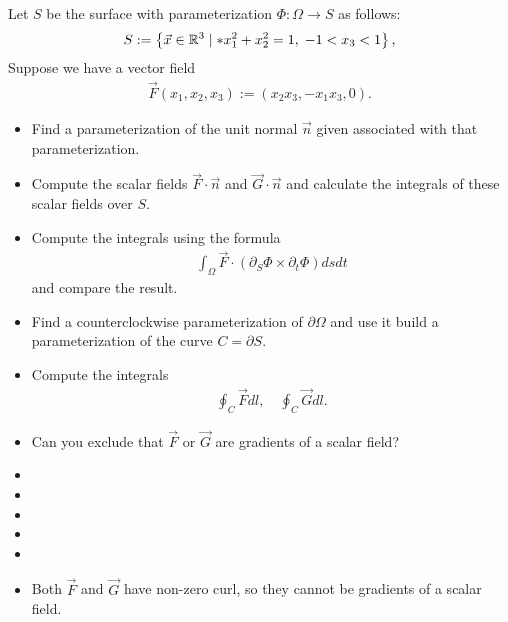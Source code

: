 \documentclass[11pt]{article}
\begin{document}
\begin{exercise}
    Let $S$ be the surface with parameterization $\Phi : \Omega \to S$ as follows:
    \begin{align}
     S := \left\{ \vec x \in \bbR^3 \suchthat* x_1^2 + x_2^2 = 1, \; -1 < x_3 < 1 \right\},
    \end{align}
    Suppose we have a vector field 
    \begin{align}
        \vec F(x_1,x_2,x_3) := (x_2 x_3, -x_1 x_3, 0 ).
    \end{align}
    \begin{itemize}
     \item
     Find a parameterization of the unit normal $\vec n$ given associated with that parameterization.
     \item
     Compute the scalar fields $\vec F \cdot \vec n$ and $\vec G \cdot \vec n$ and calculate the integrals of these scalar fields over $S$.
     \item
     Compute the integrals using the formula 
     \begin{align}
        \int_\Omega \vec F \cdot ( \partial_S \Phi \times \partial_t \Phi ) dsdt
     \end{align}
     and compare the result. 
     \item 
     Find a counterclockwise parameterization of $\partial\Omega$ and use it build a parameterization of the curve $C = \partial S$.
     \item 
     Compute the integrals 
     \begin{align}
        \oint_C \vec F dl, \quad \oint_C \vec G dl.
     \end{align}
     \item 
     Can you exclude that $\vec F$ or $\vec G$ are gradients of a scalar field?
    \end{itemize}
\end{exercise}
\begin{solution}     
    \begin{itemize}
     \item
     \item
     \item
     \item 
     \item 
     \item 
     Both $\vec F$ and $\vec G$ have non-zero curl, so they cannot be gradients of a scalar field. 
    \end{itemize}
\end{solution}
\end{document}

